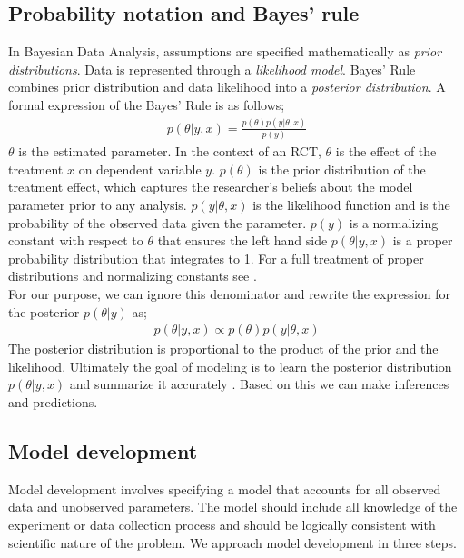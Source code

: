 \documentclass{article}
\begin{document}
\subsection{Probability notation and Bayes' rule}
In Bayesian Data Analysis, assumptions are specified mathematically as \textit{prior distributions}.  Data is represented through a \textit{likelihood model}. Bayes' Rule combines prior distribution and data likelihood into a \textit{posterior distribution}.  A formal expression of the Bayes' Rule is as follows;
\begin{align}
{p(\theta| y, x) = \frac{ p(\theta) p(y|\theta, x)}{p(y)}}
\end{align}
$\theta$ is the estimated parameter. In the context of an RCT, $\theta$ is the effect of the treatment $x$ on dependent variable $y$. $p(\theta)$ is the prior distribution of the treatment effect, which captures the researcher's beliefs about the model parameter prior to any analysis. $p(y | \theta, x)$ is the likelihood function and is the probability of the observed data given the parameter.  $p(y)$ is a normalizing constant with respect to $\theta$ that ensures the left hand side $p(\theta |y, x)$ is a proper probability distribution that integrates to 1. For a full treatment of proper distributions and normalizing constants see  . \\
For our purpose, we can ignore this denominator and rewrite the expression for the posterior $p(\theta | y)$ as;
 \begin{align}
 p(\theta | y, x) \propto p(\theta) p(y |\theta, x)
 \end{align}
The posterior distribution is proportional to the product of the prior and the likelihood. Ultimately the goal of modeling is to learn the posterior distribution $p(\theta|y, x)$ and summarize it accurately \cite{gelman2014bayesian} . Based on this we can make inferences and predictions.

\subsection{Model development}
Model development involves specifying a model that accounts for all observed data and unobserved parameters. The model should include all knowledge of the experiment or data collection process and should be logically consistent with scientific nature of the problem. We approach model development in three steps.
\end{document}
